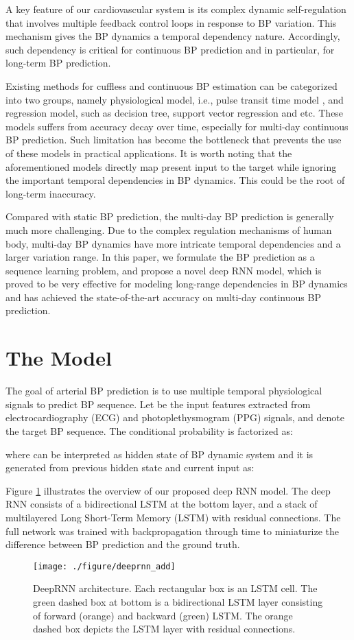 \documentclass[letterpaper, 10 pt, conference]{ieeeconf}
\begin{document}
A key feature of our cardiovascular system is its complex dynamic self-regulation that involves multiple feedback control loops in response to BP variation\cite{guyton1972arterial}. 
This mechanism gives the BP dynamics a temporal dependency nature. Accordingly, such dependency is critical for continuous BP prediction and in particular, for long-term BP prediction.


Existing methods for cuffless and continuous BP estimation can be categorized into two groups, namely physiological model, i.e., pulse transit time model\cite{chen2000continuous} \cite{poon2006cuff}, and regression model, such as decision tree, support vector regression and etc\cite{miao2017novel}\cite{jain2016sparse}. 
These models suffers from accuracy decay over time, especially for multi-day continuous BP prediction. 
Such limitation has become the bottleneck that prevents the use of these models in practical applications. 
It is worth noting that the aforementioned models directly map present input to the target while ignoring the important temporal dependencies in BP dynamics. 
This could be the root of long-term inaccuracy. 
 

Compared with static BP prediction, the multi-day BP prediction is generally much more challenging. 
Due to the complex regulation mechanisms of human body, multi-day BP dynamics have more intricate temporal dependencies and a larger variation range.
In this paper, we formulate the BP prediction as a sequence learning problem, and propose a novel deep RNN model, which is proved to be very effective for modeling long-range dependencies in BP dynamics and
has achieved the state-of-the-art accuracy on multi-day continuous BP prediction.


\section{The Model}
The goal of arterial BP prediction is to use multiple temporal physiological signals to predict BP sequence.
Let  be the input features extracted from electrocardiography (ECG) and photoplethysmogram (PPG) signals, and  denote the target BP sequence.
The conditional probability  is factorized as: 

where  can be interpreted as hidden state of BP dynamic system and it is generated from previous hidden state  and current input  as:

Figure \ref{fig:deeprnn} illustrates the overview of our proposed deep RNN model.
The deep RNN consists of a bidirectional LSTM at the bottom layer, and a stack of multilayered Long Short-Term Memory (LSTM) with residual connections.
The full network was trained with backpropagation through time \cite{werbos1990backpropagation}  to miniaturize the difference between BP prediction and the ground truth.
\begin{figure}
\centering
\texttt{[image: ./figure/deeprnn\_add]}
\caption{DeepRNN architecture. Each rectangular box is an LSTM cell.
The green dashed box at bottom is a bidirectional LSTM layer consisting of forward (orange) and backward (green) LSTM.
The orange dashed box depicts the LSTM layer with residual connections.}
\label{fig:deeprnn}
\end{figure}
\end{document}
